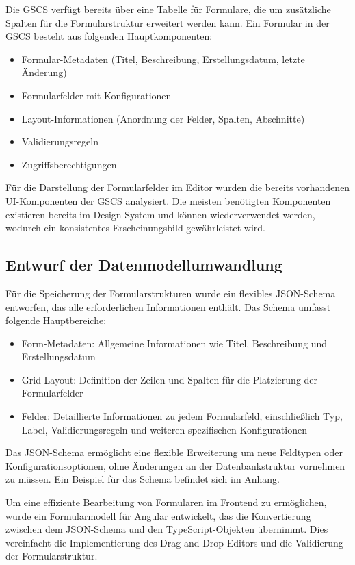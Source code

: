 \documentclass[a4paper,11pt]{article}
\begin{document}
Die GSCS verfügt bereits über eine Tabelle für Formulare, die um zusätzliche Spalten für die Formularstruktur erweitert werden kann. Ein Formular in der GSCS besteht aus folgenden Hauptkomponenten:

\begin{itemize}
  \item Formular-Metadaten (Titel, Beschreibung, Erstellungsdatum, letzte Änderung)
  \item Formularfelder mit Konfigurationen
  \item Layout-Informationen (Anordnung der Felder, Spalten, Abschnitte)
  \item Validierungsregeln
  \item Zugriffsberechtigungen
\end{itemize}

Für die Darstellung der Formularfelder im Editor wurden die bereits vorhandenen UI-Komponenten der GSCS analysiert. Die meisten benötigten Komponenten existieren bereits im Design-System und können wiederverwendet werden, wodurch ein konsistentes Erscheinungsbild gewährleistet wird.

\subsection{Entwurf der Datenmodellumwandlung}
Für die Speicherung der Formularstrukturen wurde ein flexibles JSON-Schema entworfen, das alle erforderlichen Informationen enthält. Das Schema umfasst folgende Hauptbereiche:

\begin{itemize}
  \item Form-Metadaten: Allgemeine Informationen wie Titel, Beschreibung und Erstellungsdatum
  \item Grid-Layout: Definition der Zeilen und Spalten für die Platzierung der Formularfelder
  \item Felder: Detaillierte Informationen zu jedem Formularfeld, einschließlich Typ, Label, Validierungsregeln und weiteren spezifischen Konfigurationen
\end{itemize}

Das JSON-Schema ermöglicht eine flexible Erweiterung um neue Feldtypen oder Konfigurationsoptionen, ohne Änderungen an der Datenbankstruktur vornehmen zu müssen. Ein Beispiel für das Schema befindet sich im Anhang.

Um eine effiziente Bearbeitung von Formularen im Frontend zu ermöglichen, wurde ein Formularmodell für Angular entwickelt, das die Konvertierung zwischen dem JSON-Schema und den TypeScript-Objekten übernimmt. Dies vereinfacht die Implementierung des Drag-and-Drop-Editors und die Validierung der Formularstruktur.
\end{document}
